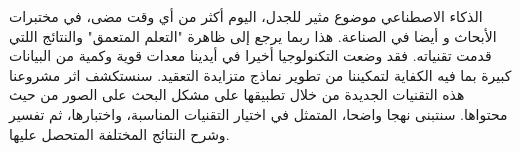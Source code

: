 \begin{RLtext}
الذكاء الاصطناعي موضوع مثير للجدل، اليوم أكثر من أي وقت مضى، في مختبرات الأبحاث و أيضا في الصناعة. هذا ربما يرجع إلى ظاهرة "التعلم المتعمق" والنتائج اللتي قدمت تقنياته. فقد وضعت التكنولوجيا أخيرا في أيدينا معدات قوية وكمية من البيانات كبيرة بما فيه الكفاية لتمكيننا من تطوير نماذج متزايدة التعقيد. سنستكشف اثر مشروعنا هذه التقنيات الجديدة من خلال تطبيقها على مشكل البحث على الصور من حيث محتواها.
 سنتبنى نهجا واضحا، المتمثل في اختيار التقنيات المناسبة، واختبارها، ثم تفسير وشرح النتائج المختلفة المتحصل عليها.
\end{RLtext}